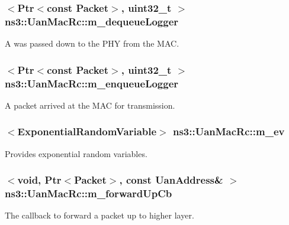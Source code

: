 \subsubsection[{\texorpdfstring{m\+\_\+dequeue\+Logger}{m_dequeueLogger}}]{$<${\bf Ptr}$<$const {\bf Packet}$>$, uint32\+\_\+t $>$ ns3\+::\+Uan\+Mac\+Rc\+::m\+\_\+dequeue\+Logger\hspace{0.3cm}{\ttfamily [private]}}\hypertarget{classns3_1_1UanMacRc_aa9a4d91db1d08882406cbfcabe72ccdf}{}\label{classns3_1_1UanMacRc_aa9a4d91db1d08882406cbfcabe72ccdf}
A was passed down to the P\+HY from the M\+AC. 
\subsubsection[{\texorpdfstring{m\+\_\+enqueue\+Logger}{m_enqueueLogger}}]{$<${\bf Ptr}$<$const {\bf Packet}$>$, uint32\+\_\+t $>$ ns3\+::\+Uan\+Mac\+Rc\+::m\+\_\+enqueue\+Logger\hspace{0.3cm}{\ttfamily [private]}}\hypertarget{classns3_1_1UanMacRc_ad69b59d9a710aee726e01ab4ce7778a5}{}\label{classns3_1_1UanMacRc_ad69b59d9a710aee726e01ab4ce7778a5}
A packet arrived at the M\+AC for transmission. 
\subsubsection[{\texorpdfstring{m\+\_\+ev}{m_ev}}]{$<${\bf Exponential\+Random\+Variable}$>$ ns3\+::\+Uan\+Mac\+Rc\+::m\+\_\+ev\hspace{0.3cm}{\ttfamily [private]}}\hypertarget{classns3_1_1UanMacRc_a46cd1ac54e4a0aa4278ee162e9fdb0d5}{}\label{classns3_1_1UanMacRc_a46cd1ac54e4a0aa4278ee162e9fdb0d5}
Provides exponential random variables. 
\subsubsection[{\texorpdfstring{m\+\_\+forward\+Up\+Cb}{m_forwardUpCb}}]{$<$void, {\bf Ptr}$<${\bf Packet}$>$, const {\bf Uan\+Address}\& $>$ ns3\+::\+Uan\+Mac\+Rc\+::m\+\_\+forward\+Up\+Cb\hspace{0.3cm}{\ttfamily [private]}}\hypertarget{classns3_1_1UanMacRc_a5e7c5946407caf5fc03bc328118005c9}{}\label{classns3_1_1UanMacRc_a5e7c5946407caf5fc03bc328118005c9}
The callback to forward a packet up to higher layer. 
